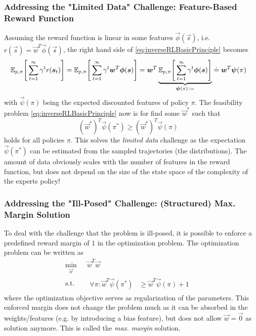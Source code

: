 			\subsubsection{Addressing the "Limited Data" Challenge: Feature-Based Reward Function}
				Assuming the reward function is linear in some features \( \vec{\phi}(\vec{s}) \), i.e. \( r(\vec{s}) = \vec{w}^T \vec{\phi}(\vec{s}) \), the right hand side of \eqref{eq:inverseRLBasicPrinciple} becomes
				\begin{equation*}
					\mathbb{E}_{p, \pi}\Bigg[ \sum_{t = 1}^{\infty} \gamma^t r(\bm{s}_t) \Bigg]
					= \mathbb{E}_{p, \pi}\Bigg[ \sum_{t = 1}^{\infty} \gamma^t \bm{w}^T \bm{\phi}(\bm{s}) \Bigg]
					= \bm{w}^T \underbrace{\mathbb{E}_{p, \pi}\Bigg[ \sum_{t = 1}^{\infty} \gamma^t \bm{\phi}(\bm{s}) \Bigg]}_{\bm{\psi}(\pi) \,\coloneqq}
					\doteq \bm{w}^T \bm{\psi}(\pi)
				\end{equation*}
				with \( \vec{\psi}(\pi) \) being the expected discounted features of policy \(\pi\). The feasibility problem \eqref{eq:inverseRLBasicPrinciple} now is for find some \( \vec{w}^\ast \) such that
				\begin{equation*}
					(\vec{w}^\ast)^T \vec{\psi}(\pi^\ast) \geq (\vec{w}^\ast)^T \vec{\psi}(\pi)
				\end{equation*}
				holds for all policies \(\pi\). This solves the \emph{limited data} challenge as the expectation \( \vec{\psi}(\pi^\ast) \) can be estimated from the sampled trajectories (the distributions). The amount of data obviously scales with the number of features in the reward function, but does not depend on the size of the state space of the complexity of the experts policy!

			\subsubsection{Addressing the "Ill-Posed" Challenge: (Structured) Max. Margin Solution}
				To deal with the challenge that the problem is ill-posed, it is possible to enforce a predefined reward margin of \(1\) in the optimization problem. The optimization problem can be written as
				\begin{equation*}
					\begin{aligned}
						\min_{\vec{w}} \,   & \vec{w}^T \vec{w} \\
						\mathrm{s.t.} \quad &
						\begin{aligned}
							\forall\pi : \vec{w}^T \vec{\psi}(\pi^\ast) & \geq \vec{w}^T \vec{\psi}(\pi) + 1
						\end{aligned}
					\end{aligned}
				\end{equation*}
				where the optimization objective serves as regularization of the parameters. This enforced margin does not change the problem much as it can be absorbed in the weights/features (e.g. by introducing a bias feature), but does not allow \( \vec{w} = \vec{0} \) as solution anymore. This is called the \emph{max. margin} solution.

